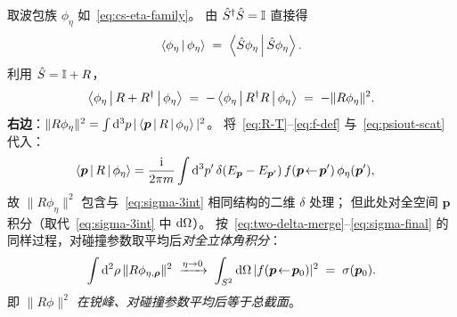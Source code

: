 \begin{proof*}
取波包族 $\phi_\eta$ 如~\eqref{eq:cs-eta-family}。
由 $\hat{S}^\dagger \hat{S} = \mathbb{I}$ 直接得
\begin{equation}
\left\langle \phi_\eta \,\middle|\, \phi_\eta \right\rangle \;=\; \left\langle \hat{S}\phi_\eta \,\middle|\, \hat{S}\phi_\eta \right\rangle.
\label{eq:cs-norm}
\end{equation}
利用 $\hat{S} = \mathbb{I} + R$，
\begin{equation}
\left\langle \phi_\eta \,\middle|\, R + R^\dagger \,\middle|\, \phi_\eta \right\rangle \;=\; -\left\langle \phi_\eta \,\middle|\, R^\dagger R \,\middle|\, \phi_\eta \right\rangle
\;=\; -\|R\phi_\eta\|^2.
\label{eq:cs-R-Rdag}
\end{equation}
\textbf{右边}：$\|R\phi_\eta\|^2 = \int\mathrm{d}^3 p\,|\left\langle \bm{p} \,\middle|\, R \,\middle|\, \phi_\eta \right\rangle|^2$。
将~\eqref{eq:R-T}--\eqref{eq:f-def} 与~\eqref{eq:psiout-scat} 代入：
\begin{align}
\left\langle \bm{p} \,\middle|\, R \,\middle|\, \phi_\eta \right\rangle &= \frac{\mathrm{i}}{2\pi m}\int\mathrm{d}^3 p'\,
\delta(E_{\bm{p}}-E_{\bm{p}'})\,f(\bm{p}\!\leftarrow\!\bm{p}')\,\phi_\eta(\bm{p}'),
\end{align}
故 $\|R\phi_\eta\|^2$ 包含与~\eqref{eq:sigma-3int} 相同结构的二维 $\delta$ 处理；
但此处对全空间 $\bm{p}$ 积分（取代~\eqref{eq:sigma-3int} 中 $\mathrm{d}\Omega$）。
按~\eqref{eq:two-delta-merge}--\eqref{eq:sigma-final} 的同样过程，对碰撞参数取平均后\emph{对全立体角积分}：
\begin{equation}
\int\mathrm{d}^2\rho\,\|R\phi_{\eta,\bm{\rho}}\|^2
\;\xrightarrow{\eta\to 0}\;
\int_{S^2}\mathrm{d}\Omega\,|f(\bm{p}\!\leftarrow\!\bm{p}_0)|^2 \;=\; \sigma(\bm{p}_0).
\label{eq:cs-Rphi-norm}
\end{equation}
即 \emph{$\|R\phi\|^2$ 在锐峰、对碰撞参数平均后等于总截面}。


\end{proof*}
